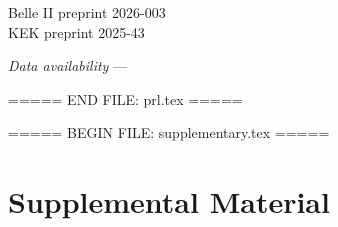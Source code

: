 {\usepackage{bibentry}
 \usepackage{comment}
 \let\endalign\relax
 \let\endequation\relax
 \let\endeqnarray\relax
 \let\endacknowledgments\relax
 \def\maketitle{}
}{}




\begin{flushright}
Belle II preprint 2026-003 \\
KEK preprint 2025-43 \\
\end{flushright}


\title{}



\begin{abstract}

\end{abstract}

\maketitle



\begin{acknowledgments}

\end{acknowledgments}

\textit{Data availability} ---














===== END FILE: prl.tex =====

===== BEGIN FILE: supplementary.tex =====
\newpage
\section{Supplemental Material}\label{sec:supplementary}

